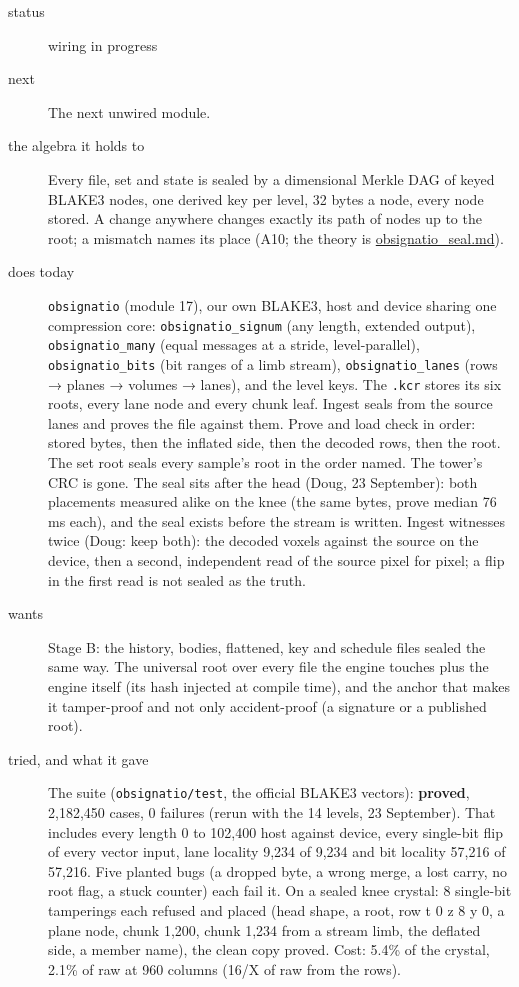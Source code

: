 \begin{description}
\item[{status}] wiring in progress
\item[{next}] The next unwired module.
\end{description}

\begin{description}
\item[{the algebra it holds to}] Every file, set and state is sealed by a dimensional Merkle DAG of keyed BLAKE3 nodes, one derived key per level, 32 bytes a node, every node stored. A change anywhere changes exactly its path of nodes up to the root; a mismatch names its place (A10; the theory is \hyperref[chap:obsignatio-seal]{obsignatio\_\allowbreak{}seal.md}).
\item[{does today}] \texttt{obsignatio} (module 17), our own BLAKE3, host and device sharing one compression core: \texttt{obsignatio\_\allowbreak{}signum} (any length, extended output), \texttt{obsignatio\_\allowbreak{}many} (equal messages at a stride, level-parallel), \texttt{obsignatio\_\allowbreak{}bits} (bit ranges of a limb stream), \texttt{obsignatio\_\allowbreak{}lanes} (rows → planes → volumes → lanes), and the level keys. The \texttt{.\allowbreak{}kcr} stores its six roots, every lane node and every chunk leaf. Ingest seals from the source lanes and proves the file against them. Prove and load check in order: stored bytes, then the inflated side, then the decoded rows, then the root. The set root seals every sample's root in the order named. The tower's CRC is gone. The seal sits after the head (Doug, 23 September): both placements measured alike on the knee (the same bytes, prove median 76 ms each), and the seal exists before the stream is written. Ingest witnesses twice (Doug: keep both): the decoded voxels against the source on the device, then a second, independent read of the source pixel for pixel; a flip in the first read is not sealed as the truth.
\item[{wants}] Stage B: the history, bodies, flattened, key and schedule files sealed the same way. The universal root over every file the engine touches plus the engine itself (its hash injected at compile time), and the anchor that makes it tamper-proof and not only accident-proof (a signature or a published root).
\item[{tried, and what it gave}] The suite (\texttt{obsignatio/\allowbreak{}test}, the official BLAKE3 vectors): \textbf{proved}, 2,182,450 cases, 0 failures (rerun with the 14 levels, 23 September). That includes every length 0 to 102,400 host against device, every single-bit flip of every vector input, lane locality 9,234 of 9,234 and bit locality 57,216 of 57,216. Five planted bugs (a dropped byte, a wrong merge, a lost carry, no root flag, a stuck counter) each fail it. On a sealed knee crystal: 8 single-bit tamperings each refused and placed (head shape, a root, row t 0 z 8 y 0, a plane node, chunk 1,200, chunk 1,234 from a stream limb, the deflated side, a member name), the clean copy proved. Cost: 5.4\% of the crystal, 2.1\% of raw at 960 columns (16/X of raw from the rows).

\end{description}
